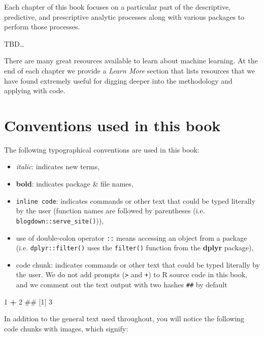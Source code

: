 \documentclass[]{book}
\newenvironment{Shaded}{\begin{snugshade}}{\end{snugshade}}
\newcommand{\DecValTok}[1]{\textcolor[rgb]{0.00,0.00,0.81}{#1}}
\newcommand{\NormalTok}[1]{#1}
\newcommand{\OperatorTok}[1]{\textcolor[rgb]{0.81,0.36,0.00}{\textbf{#1}}}
\newcommand{\StringTok}[1]{\textcolor[rgb]{0.31,0.60,0.02}{#1}}
\providecommand{\tightlist}{%
  \setlength{\itemsep}{0pt}\setlength{\parskip}{0pt}}
\theoremstyle{definition}
\theoremstyle{definition}
\theoremstyle{definition}
\theoremstyle{remark}
\begin{document}
Each chapter of this book focuses on a particular part of the
descriptive, predictive, and prescriptive analytic processes along with
various packages to perform those processes.

TBD\ldots{}

There are many great resources available to learn about machine
learning. At the end of each chapter we provide a \emph{Learn More}
section that lists resources that we have found extremely useful for
digging deeper into the methodology and applying with code.

\hypertarget{conventions-used-in-this-book}{%
\section*{Conventions used in this
book}\label{conventions-used-in-this-book}}

The following typographical conventions are used in this book:

\begin{itemize}
\tightlist
\item
  \emph{italic}: indicates new terms,
\item
  \textbf{bold}: indicates package \& file names,
\item
  \texttt{inline\ code}: indicates commands or other text that could be
  typed literally by the user (function names are followed by
  parentheses (i.e. \texttt{blogdown::serve\_site()})),
\item
  use of double-colon operator \texttt{::} means accessing an object
  from a package (i.e. \texttt{dplyr::filter()} uses the
  \texttt{filter()} function from the \textbf{dplyr} package),
\item
  code chunk: indicates commands or other text that could be typed
  literally by the user. We do not add prompts (\texttt{\textgreater{}}
  and \texttt{+}) to R source code in this book, and we comment out the
  text output with two hashes \texttt{\#\#} by default
\end{itemize}

\begin{Shaded}
\begin{Highlighting}[]
\DecValTok{1} \OperatorTok{+}\StringTok{ }\DecValTok{2}
\NormalTok{## [1] 3}
\end{Highlighting}
\end{Shaded}

In addition to the general text used throughout, you will notice the
following code chunks with images, which signify:
\end{document}

